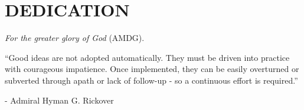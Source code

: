 %
%
%

\chapter*{DEDICATION}

\begin{center}
\vspace{60 mm}
{\em For the greater glory of God} (AMDG).

\vspace{80 mm}
``Good ideas are not adopted automatically. They must be driven into practice with courageous impatience. Once implemented, they can be easily overturned or subverted through apath or lack of follow-up - so a continuous effort is required.''

- Admiral Hyman G. Rickover

\end{center}
\pagebreak{}
